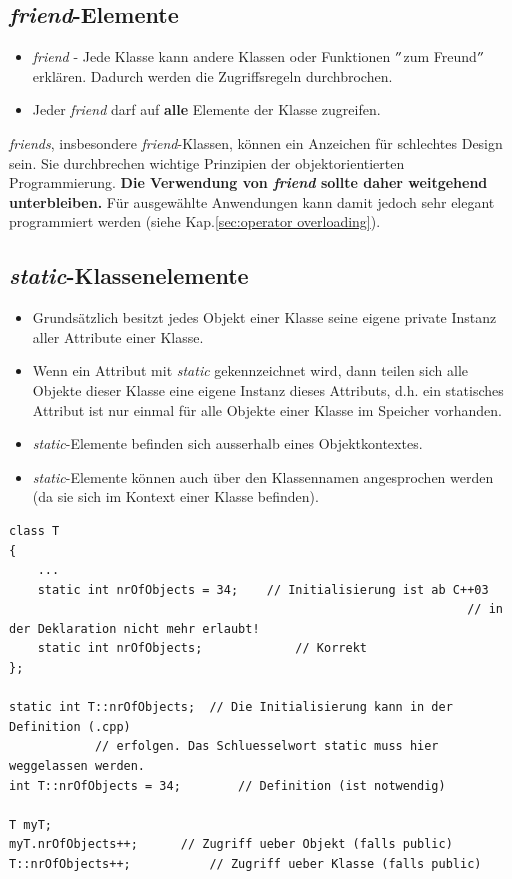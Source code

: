 \subsection{\emph{friend}-Elemente}
\begin{itemize}
	\item \emph{friend} - Jede Klasse kann andere Klassen oder Funktionen $"$zum Freund$"$ erklären. Dadurch werden die Zugriffsregeln durchbrochen.
	\item Jeder \emph{friend} darf auf \textbf{alle} Elemente der Klasse zugreifen.
\end{itemize}
\begin{achtung}
	\emph{friends}, insbesondere \emph{friend}-Klassen, können ein Anzeichen für schlechtes Design sein. Sie durchbrechen wichtige Prinzipien der objektorientierten Programmierung.
	\textbf{Die Verwendung von \emph{friend} sollte daher weitgehend unterbleiben.}
	Für ausgewählte Anwendungen kann damit jedoch sehr elegant programmiert werden (siehe Kap.\ref{sec:operator overloading}).
\end{achtung}

\subsection{\emph{static}-Klassenelemente}
\begin{itemize}
	\item Grundsätzlich besitzt jedes Objekt einer Klasse seine eigene private Instanz aller Attribute einer Klasse.
	\item Wenn ein Attribut mit \emph{static} gekennzeichnet wird, dann teilen sich alle Objekte dieser Klasse eine eigene Instanz dieses Attributs, d.h. ein statisches Attribut ist nur einmal für alle Objekte einer Klasse im Speicher vorhanden.
	\item \emph{static}-Elemente befinden sich ausserhalb eines Objektkontextes.
	\item \emph{static}-Elemente können auch über den Klassennamen angesprochen werden (da sie sich im Kontext einer Klasse befinden).
\end{itemize}
\vspace{-\baselineskip}
\begin{minipage}{\linewidth}
\begin{lstlisting}
class T
{
	...
	static int nrOfObjects = 34;	// Initialisierung ist ab C++03
																// in der Deklaration nicht mehr erlaubt!
	static int nrOfObjects;				// Korrekt
};

static int T::nrOfObjects;	// Die Initialisierung kann in der Definition (.cpp)
			// erfolgen. Das Schluesselwort static muss hier weggelassen werden.
int T::nrOfObjects = 34;		// Definition (ist notwendig)

T myT;
myT.nrOfObjects++;		// Zugriff ueber Objekt (falls public)
T::nrOfObjects++;			// Zugriff ueber Klasse (falls public)
\end{lstlisting}
\end{minipage}


